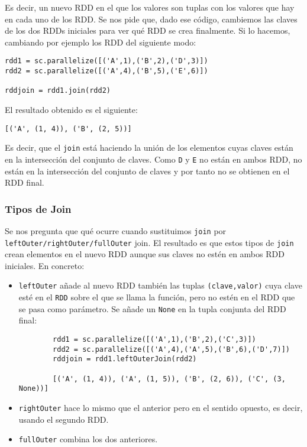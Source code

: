 \documentclass[11pt]{article}
\def\inline{\lstinline[basicstyle=\ttfamily,keywordstyle={}]}
\begin{document}
Es decir, un nuevo RDD en el que los valores son tuplas con los valores que hay en cada uno de los RDD. Se nos pide que, dado ese código, cambiemos las claves de los dos RDDs iniciales para ver qué RDD se crea finalmente. Si lo hacemos, cambiando por ejemplo los RDD del siguiente modo:
\begin{verbatim}
rdd1 = sc.parallelize([('A',1),('B',2),('D',3)])
rdd2 = sc.parallelize([('A',4),('B',5),('E',6)])

rddjoin = rdd1.join(rdd2)
\end{verbatim}
El resultado obtenido es el siguiente:
\begin{verbatim}
[('A', (1, 4)), ('B', (2, 5))]
\end{verbatim}
Es decir, que el \inline{join} está haciendo la unión de los elementos cuyas claves están en la intersección del conjunto de claves. Como \inline{D} y \inline{E} no están en ambos RDD, no están en la intersección del conjunto de claves y por tanto no se obtienen en el RDD final.

\subsubsection*{ Tipos de Join }

Se nos pregunta que qué ocurre cuando sustituimos \inline{join} por \inline{leftOuter/rightOuter/fullOuter} join. El resultado es que estos tipos de \inline{join} crean elementos en el nuevo RDD aunque sus claves no estén en ambos RDD iniciales. En concreto:

\begin{itemize}
		\item \inline{leftOuter} añade al nuevo RDD también las tuplas \inline{(clave,valor)} cuya clave esté en el \inline{RDD} sobre el que se llama la función, pero no estén en el RDD que se pasa como parámetro. Se añade un \inline{None} en la tupla conjunta del RDD final:
		
		\begin{verbatim}
		rdd1 = sc.parallelize([('A',1),('B',2),('C',3)])
		rdd2 = sc.parallelize([('A',4),('A',5),('B',6),('D',7)])
		rddjoin = rdd1.leftOuterJoin(rdd2)
		
		[('A', (1, 4)), ('A', (1, 5)), ('B', (2, 6)), ('C', (3, None))]
		\end{verbatim}
	
		\item \inline{rightOuter} hace lo mismo que el anterior pero en el sentido opuesto, es decir, usando el segundo RDD.
		\item \inline{fullOuter} combina los dos anteriores.
\end{itemize}
\end{document}
